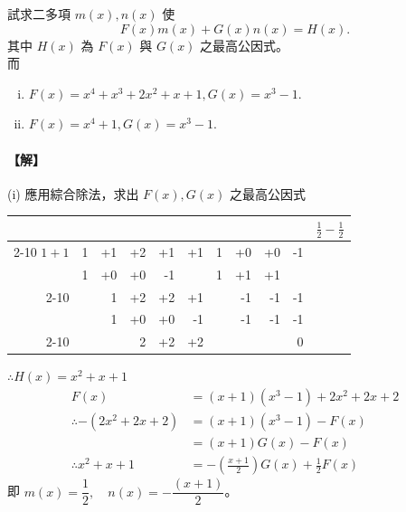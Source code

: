 \begin{example}\label{ex:7-1-7}
試求二多項 $m(x), n(x)$ 使
\begin{equation*}
  F(x)m(x)+G(x)n(x) = H(x).
\end{equation*}
其中 $H(x)$ 為 $F(x)$ 與 $G(x)$ 之最高公因式。\\
而
\begin{enumerate}[(i)]
  \item $F(x) = x^4+x^3+2x^2+x+1, G(x) = x^3-1$.
  \item $F(x) = x^4+1, G(x) = x^3-1$.
\end{enumerate}

\paragraph{【解】}
(i) 應用綜合除法，求出 $F(x), G(x)$ 之最高公因式
\begin{center}
\renewcommand{\arraystretch}{1.2}
\begin{tabular}{r|rrrrr|rrrr|l}
\multicolumn{1}{c}{} & \multicolumn{5}{c}{} & \multicolumn{4}{c}{} & $\frac{1}{2} - \frac{1}{2}$ \\ \cline{2-10}
$1+1$ & 1 & +1 & +2 & +1 & +1 & 1 & +0 & +0 & -1 & \\
      & 1 & +0 & +0 & -1 &    & 1 & +1 & +1 &    & \\ \cline{2-10}
      &   & 1  & +2 & +2 & +1 &   & -1 & -1 & -1 & \\
      &   & 1  & +0 & +0 & -1 &   & -1 & -1 & -1 & \\ \cline{2-10}
      &   &    & 2  & +2 & +2 &   &    &    & 0  &
\end{tabular}
\end{center}
$\therefore H(x) = x^2+x+1$\\
\begin{align*}
  F(x) &= (x+1)(x^3-1) + 2x^2+2x+2 \\
  \therefore -(2x^2+2x+2) &= (x+1)(x^3-1) - F(x) \\
  &= (x+1)G(x) - F(x) \\
  \therefore x^2+x+1 &= -\left(\frac{x+1}{2}\right)G(x) + \frac{1}{2}F(x)
\end{align*}
即 $m(x) = \dfrac{1}{2}, \quad n(x) = -\dfrac{(x+1)}{2}$。


\end{example}
